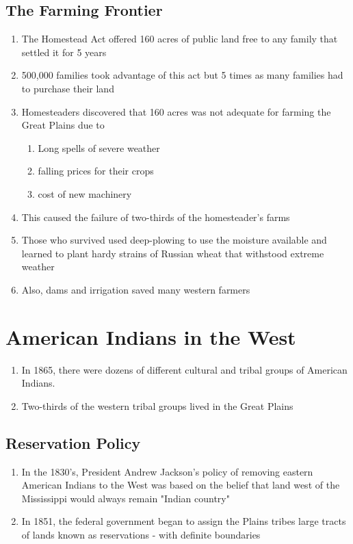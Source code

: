 \documentclass[12pt]{article} %
\begin{document}
\subsection{The Farming Frontier}
\begin{enumerate}
	\item The Homestead Act offered 160 acres of public land free to any family that settled it for
		5 years
	\item 500,000 families took advantage of this act but 5 times as many families had to purchase
		their land
	\item Homesteaders discovered that 160 acres was not adequate for farming the Great Plains due to
		\begin{enumerate}
			\item Long spells of severe weather
			\item falling prices for their crops
			\item cost of new machinery
		\end{enumerate}
	\item This caused the failure of two-thirds of the homesteader's farms
	\item Those who survived used deep-plowing to use the moisture available and learned to plant 
		hardy strains of Russian wheat that withstood extreme weather
	\item Also, dams and irrigation saved many western farmers 
\end{enumerate}

\section{American Indians in the West}
\begin{enumerate}
	\item In 1865, there were dozens of different cultural and tribal groups of American Indians.
	\item Two-thirds of the western tribal groups lived in the Great Plains
\end{enumerate}

\subsection{Reservation Policy}
\begin{enumerate}
	\item In the 1830's, President Andrew Jackson's policy of removing eastern American Indians to
		the West was based on the belief that land west of the Mississippi would always remain 
		"Indian country"
	\item In 1851, the federal government began to assign the Plains tribes large tracts of lands
		known as reservations - with definite boundaries
\end{enumerate}
\end{document}
